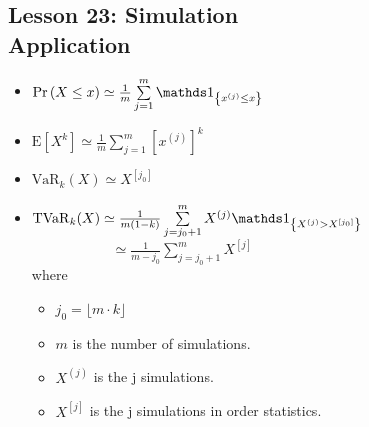 \documentclass[10pt, french]{article}
\begin{document}
\begin{multicols*}{3}
\section*{Lesson 23: Simulation \\ Application}
\label{Lesson 23}
\begin{itemize}[align=left,leftmargin=*]
    \item $\prob{X \leq x} \simeq \frac{1}{m} \sum\limits_{j=1}^{m} \indic{x^{(j)} \leq x}  $
    \item $\mathrm{E}[X^k] \simeq \frac{1}{m} \sum\limits_{j=1}^{m} [x^{(j)}]^k  $
    \item $\mathrm{VaR}_k(X) \simeq X^{[j_0]} $
    \item $\mathrm{TVaR}_k(X) \simeq \frac{1}{m(1-k)} \sum\limits_{j=j_0+1}^{m} X^{(j)} \indic{X^{(j)}>X^{[j_0]}} $ \\ $\phantom{\mathrm{TVaR}_k(X)}  \simeq \frac{1}{m-j_0} \sum\limits_{j=j_0+1}^{m} X^{[j]} $ \\ where
    \begin{itemize}
        \item $j_0 = \lfloor m \cdot k \rfloor$
        \item $m$ is the number of simulations.
        \item $X^{(j)}$ is the j simulations.
        \item $X^{[j]}$ is the j simulations in order statistics.
    \end{itemize}
\end{itemize}


\end{multicols*}
\end{document}
